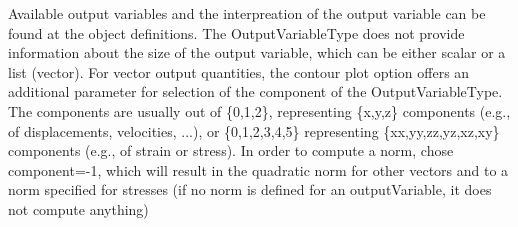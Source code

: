 Available output variables and the interpreation of the output variable can be found at the object definitions. 
 The OutputVariableType does not provide information about the size of the output variable, which can be either scalar or a list (vector). For vector output quantities, the contour plot option offers an additional parameter for selection of the component of the OutputVariableType. The components are usually out of \{0,1,2\}, representing \{x,y,z\} components (e.g., of displacements, velocities, ...), or \{0,1,2,3,4,5\} representing \{xx,yy,zz,yz,xz,xy\} components (e.g., of strain or stress). In order to compute a norm, chose component=-1, which will result in the quadratic norm for other vectors and to a norm specified for stresses (if no norm is defined for an outputVariable, it does not compute anything)


